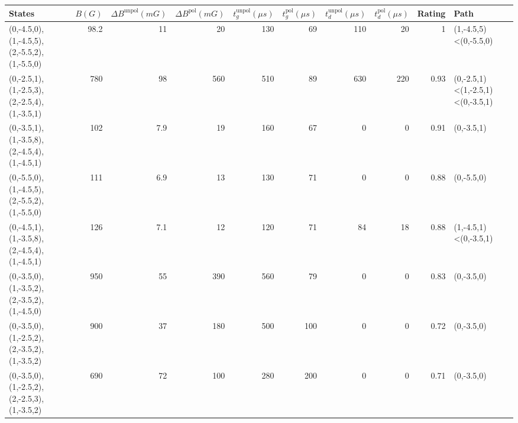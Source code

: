 \begin{tabular}{lrrrrrrrrl}
\hline
 {States}                                    &   {$B(G)$} &   {$\Delta B^{\text{unpol}}(mG)$} &   {$\Delta B^{\text{pol}}(mG)$} &   {$t^{\text{unpol}}_{g}(\mu s)$} &   {$t^{\text{pol}}_{g}(\mu s)$} &   {$t^{\text{unpol}}_{d}(\mu s)$} &   {$t^{\text{pol}}_{d}(\mu s)$} &   {Rating} & {Path}                           \\
\hline
 (0,-4.5,0),(1,-4.5,5),(2,-5.5,2),(1,-5.5,0) &       98.2 &                              11   &                              20 &                               130 &                              69 &                               110 &                              20 &       1    & (1,-4.5,5)<(0,-5.5,0)            \\
 (0,-2.5,1),(1,-2.5,3),(2,-2.5,4),(1,-3.5,1) &      780   &                              98   &                             560 &                               510 &                              89 &                               630 &                             220 &       0.93 & (0,-2.5,1)<(1,-2.5,1)<(0,-3.5,1) \\
 (0,-3.5,1),(1,-3.5,8),(2,-4.5,4),(1,-4.5,1) &      102   &                               7.9 &                              19 &                               160 &                              67 &                                 0 &                               0 &       0.91 & (0,-3.5,1)                       \\
 (0,-5.5,0),(1,-4.5,5),(2,-5.5,2),(1,-5.5,0) &      111   &                               6.9 &                              13 &                               130 &                              71 &                                 0 &                               0 &       0.88 & (0,-5.5,0)                       \\
 (0,-4.5,1),(1,-3.5,8),(2,-4.5,4),(1,-4.5,1) &      126   &                               7.1 &                              12 &                               120 &                              71 &                                84 &                              18 &       0.88 & (1,-4.5,1)<(0,-3.5,1)            \\
 (0,-3.5,0),(1,-3.5,2),(2,-3.5,2),(1,-4.5,0) &      950   &                              55   &                             390 &                               560 &                              79 &                                 0 &                               0 &       0.83 & (0,-3.5,0)                       \\
 (0,-3.5,0),(1,-2.5,2),(2,-3.5,2),(1,-3.5,2) &      900   &                              37   &                             180 &                               500 &                             100 &                                 0 &                               0 &       0.72 & (0,-3.5,0)                       \\
 (0,-3.5,0),(1,-2.5,2),(2,-2.5,3),(1,-3.5,2) &      690   &                              72   &                             100 &                               280 &                             200 &                                 0 &                               0 &       0.71 & (0,-3.5,0)                       \\
\hline
\end{tabular}